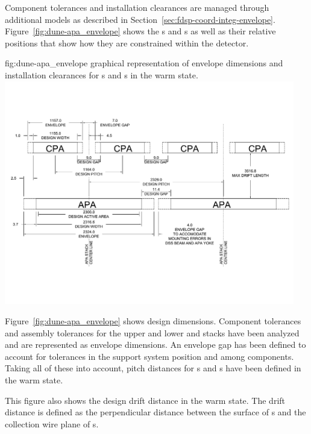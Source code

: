 Component tolerances and installation clearances are managed through
additional models as described in
Section~\ref{sec:fdsp-coord-integ-envelope}.
Figure~\ref{fig:dune-apa_envelope} shows the s and
s as well as their relative positions that show how they are
constrained within the detector.
\begin{dunefigure}
    {fig:dune-apa_envelope} { graphical
    representation of envelope dimensions and installation clearances
    for s and s in the warm state.}
  \includegraphics[width=0.95\textwidth]{graphics/Warm_envelope_dimensions.pdf}
\end{dunefigure}



Figure~\ref{fig:dune-apa_envelope} shows design dimensions. Component
tolerances and assembly tolerances for the upper and lower
 and  stacks have been analyzed and are
represented as envelope dimensions. An envelope gap has been defined
to account for tolerances in the support system position and among
components. Taking all of these into account, pitch distances for
s and s have been defined in the warm state.

This figure also shows the design drift distance in the warm
state. The drift distance is defined as the perpendicular distance
between the surface of s and the collection wire plane of
s.

